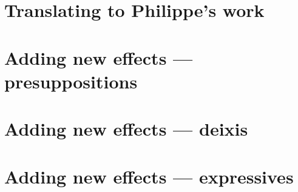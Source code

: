 \documentclass{beamer}
\begin{document}
\section{Translating to Philippe's work}


\section{Adding new effects --- presuppositions}


\section{Adding new effects --- deixis}


\section{Adding new effects --- expressives}
\end{document}
